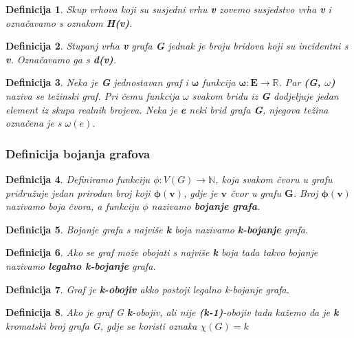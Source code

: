 \documentclass[times, utf8, diplomski, numeric]{fer}
\newtheorem{definition}{Definicija}
\begin{document}
\begin{definition}
Skup vrhova koji su susjedni vrhu \textbf{v} zovemo susjedstvo vrha \textbf{v} i označavamo s oznakom \textbf{H(v)}.
\end{definition}

\begin{definition}
Stupanj vrha \textbf{v} grafa \textbf{G} jednak je broju bridova koji su incidentni s \textbf{v}. Označavamo ga s \textbf{d(v)}.
\end{definition}

\begin{definition}
Neka je \textbf{G} jednostavan graf i $\mathbf{\omega}$ funkcija $\mathbf{\omega : E \rightarrow \mathbb{R}}$. Par \textbf{(G, $\omega$)} naziva se težinski graf. Pri čemu funkcija $\omega$ svakom bridu iz \textbf{G} dodjeljuje jedan element iz skupa realnih brojeva. Neka je \textbf{e} neki brid grafa \textbf{G}, njegova težina označena je s $\omega(\mathbf{\mathit{e}})$.	 
\end{definition}


\subsubsection{Definicija bojanja grafova}

\begin{definition}
Definiramo funkciju $\phi : V(G) \rightarrow \mathbb{N}$, koja svakom čvoru u grafu pridružuje jedan prirodan broj koji $\mathbf{\phi(v)}$, gdje je $\mathbf{v}$ čvor u grafu $\mathbf{G}$. Broj $\mathbf{\phi(v)}$ nazivamo boja čvora, a funkciju $\phi$ nazivamo \textbf{bojanje grafa}. 
\end{definition}

\begin{definition}
Bojanje grafa s najviše \textbf{k} boja nazivamo \textbf{k-bojanje} grafa. 
\end{definition}

\begin{definition}
Ako se graf može obojati s najviše \textbf{k} boja tada takvo bojanje nazivamo \textbf{legalno k-bojanje} grafa. 
\end{definition}

\begin{definition}
Graf je \textbf{k-obojiv} akko postoji legalno k-bojanje grafa.
\end{definition}


\begin{definition}
Ako je graf G \textbf{k}-obojiv, ali nije \textbf{(k-1)}-obojiv tada kažemo da je \textbf{k} kromatski broj grafa G, gdje se koristi oznaka $\chi(G)=k$  
\end{definition}
\end{document}
